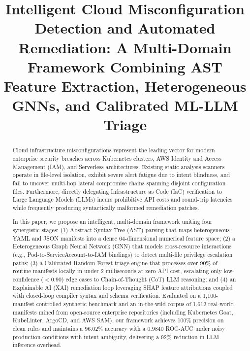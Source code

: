 \documentclass[conference]{IEEEtran}
\begin{document}
\title{Intelligent Cloud Misconfiguration Detection and Automated Remediation: A Multi-Domain Framework Combining AST Feature Extraction, Heterogeneous GNNs, and Calibrated ML-LLM Triage}

\author{
}

\maketitle

\begin{abstract}
Cloud infrastructure misconfigurations represent the leading vector for modern enterprise security breaches across Kubernetes clusters, AWS Identity and Access Management (IAM), and Serverless architectures. Existing static analysis scanners operate in file-level isolation, exhibit severe alert fatigue due to intent blindness, and fail to uncover multi-hop lateral compromise chains spanning disjoint configuration files. Furthermore, directly delegating Infrastructure as Code (IaC) verification to Large Language Models (LLMs) incurs prohibitive API costs and round-trip latencies while frequently producing syntactically malformed remediation patches.

In this paper, we propose an intelligent, multi-domain framework uniting four synergistic stages: (1) Abstract Syntax Tree (AST) parsing that maps heterogeneous YAML and JSON manifests into a dense 64-dimensional numerical feature space; (2) a Heterogeneous Graph Neural Network (GNN) that models cross-resource interactions (e.g., Pod-to-ServiceAccount-to-IAM bindings) to detect multi-file privilege escalation paths; (3) a Calibrated Random Forest triage engine that processes over 90\% of routine manifests locally in under 2 milliseconds at zero API cost, escalating only low-confidence ($<0.90$) edge cases to Chain-of-Thought (CoT) LLM reasoning; and (4) an Explainable AI (XAI) remediation loop leveraging SHAP feature attributions coupled with closed-loop compiler syntax and schema verification. Evaluated on a 1,100-manifest controlled synthetic benchmark and an in-the-wild corpus of 1,612 real-world manifests mined from open-source enterprise repositories (including Kubernetes Goat, KubeLinter, ArgoCD, and AWS SAM), our framework achieves 100\% precision on clean rules and maintains a 96.02\% accuracy with a 0.9840 ROC-AUC under noisy production conditions with intent ambiguity, delivering a 92\% reduction in LLM inference overhead.
\end{abstract}
\end{document}
